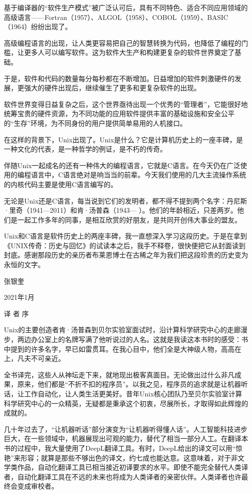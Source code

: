 \documentclass[a4paper,12pt,UTF8,twoside]{ctexbook}
\begin{document}
基于编译器的“软件生产模式”被广泛认可后，具有不同特色、适合不同应用领域的高级语言——Fortran（1957）、ALGOL（1958）、COBOL（1959）、BASIC（1964）纷纷出现了。

高级编程语言的出现，让人类更容易把自己的智慧转换为代码，也降低了编程的门槛，让更多人可以编写软件。这为软件大生产和构建更复杂的软件世界奠定了基础。

于是，软件和代码的数量每分每秒都在不断增加。日益增加的软件刺激硬件的发展，更强大的硬件出现后，继续催生了更多和更复杂软件的出现。

软件世界变得日益复杂之后，这个世界亟待出现一个优秀的“管理者”，它能很好地统筹宝贵的硬件资源，为不同功能的应用软件提供丰富的基础设施和安全公平的“生存”环境，为不同身份的用户提供简单易用的人机接口。

在这样的背景下，Unix出现了。Unix是什么？它是计算机历史上的一座丰碑，是一种文化的代表，是一种哲学的例证，是不朽的传奇。

伴随Unix一起成名的还有一种伟大的编程语言，它就是C语言。在今天仍在广泛使用的编程语言中，C语言绝对是响当当的前辈。今天我们使用的几大主流操作系统的内核代码主要是使用C语言编写的。

无论是Unix还是C语言，每当说到它们的发明者，都不得不提到两个名字：丹尼斯·里奇（1941—2011）和肯·汤普森（1943— ）。他们的年龄相近，只差两岁。他们是一起工作多年的同事，是相互欣赏的好朋友，是共同开创伟大事业的盟友。

Unix和C语言是软件历史上的两座丰碑，我一直想深入学习这段历史。于是在拿到《UNIX传奇：历史与回忆》的试读本之后，我手不释卷，很快便把它从封面读到封底。感谢那段历史的亲历者布莱恩博士在古稀之年为我们把这段珍贵的历史变为永恒的文字。

张银奎

2021年1月





译 者 序


Unix的主要创造者肯·汤普森到贝尔实验室面试时，沿计算科学研究中心的走廊漫步，两边办公室上的名牌写满了他听说过的人名。这就是我读这本书时的感受：书中提到的许多名字，早已如雷贯耳。在我心目中，他们全是大神级人物，高高在上，凡夫不可亲近。

全书译完，这些人从神坛走下来，就地现出极客真面目。无论做出过什么非凡成果，原来，他们都是“不折不扣的程序员”。以我之见，程序员的追求就是让机器听话，让工作自动化，让人类生活更美好。昔年Unix核心团队乃至贝尔实验室计算科学研究中心的一众精英，无疑都是秉承这个初衷，尽展所长，才取得如此辉煌的成就的。

几十年过去了，“让机器听话”部分演变为“让机器听得懂人话”。人工智能科技进步巨大，在一些领域中，机器展现出可观的能力，替代了相当一部分人工。在翻译本书的过程中，我大量使用了DeepL翻译工具。有时，DeepL给出的译文可以用“惊艳”来形容；就算是那些不够出色的译文，约七成也能达意。这意味着，对于非文学类作品，自动化翻译工具已相当接近初译要求的水平。即使不能完全替代人类译者，自动化翻译工具在不远的未来也将成为人类译者的亲密伙伴。人类译者也许最终会变成审校者。
\end{document}
